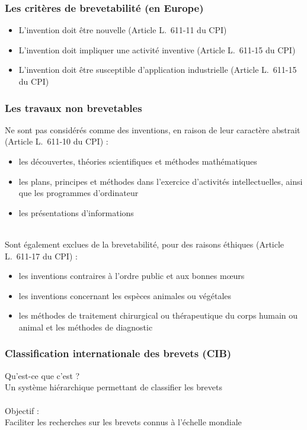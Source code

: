 \documentclass{beamer}
\begin{document}
\begin{frame}
\frametitle{Les critères de brevetabilité (en Europe)}
\begin{itemize}
	\item L’invention doit être nouvelle (Article L.~611-11 du CPI)
	\item L’invention doit impliquer une activité inventive (Article L.~611-15 du CPI)
	\item L’invention doit être susceptible d’application industrielle (Article L.~611-15 du CPI)
\end{itemize}
\end{frame}

\begin{frame}
\frametitle{Les travaux non brevetables}
Ne sont pas considérés comme des inventions, en raison de leur caractère abstrait (Article L.~611-10 du CPI) :
\begin{itemize}
	\item les découvertes, théories scientifiques et méthodes mathématiques
	\item les plans, principes et méthodes dans l’exercice d’activités intellectuelles, ainsi que les programmes d’ordinateur
	\item les présentations d’informations
\end{itemize}
~\\
Sont également exclues de la brevetabilité, pour des raisons éthiques (Article L.~611-17 du CPI) :
\begin{itemize}
	\item les inventions contraires à l’ordre public et aux bonnes mœurs
	\item les inventions concernant les espèces animales ou végétales
	\item les méthodes de traitement chirurgical ou thérapeutique du corps humain ou animal et les méthodes de diagnostic
\end{itemize}
\end{frame}

\begin{frame}
\frametitle{Classification internationale des brevets (CIB)}
Qu'est-ce que c'est ?\\
Un système hiérarchique permettant de classifier les brevets\\
~\\
Objectif :\\
Faciliter les recherches sur les brevets connus à l'échelle mondiale
\end{frame}
\end{document}
